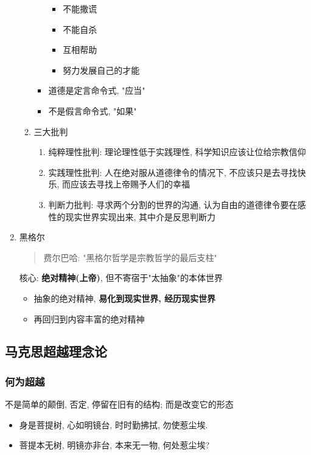 \documentclass[11pt]{article}
\begin{document}
\begin{enumerate}
\begin{enumerate}
\begin{itemize}
\begin{itemize}
\item 不能撒谎
\item 不能自杀
\item 互相帮助
\item 努力发展自己的才能
\end{itemize}
\item 道德是定言命令式, "应当"
\item 不是假言命令式, "如果"
\end{itemize}
\item 三大批判
\label{sec:org4855145}
\begin{enumerate}
\item 纯粹理性批判: 理论理性低于实践理性, 科学知识应该让位给宗教信仰
\item 实践理性批判: 人在绝对服从道德律令的情况下, 不应该只是去寻找快乐, 而应该去寻找上帝赐予人们的幸福
\item 判断力批判: 寻求两个分割的世界的沟通, 认为自由的道德律令要在感性的现实世界实现出来, 其中介是反思判断力
\end{enumerate}
\end{enumerate}
\item 黑格尔
\label{sec:org552c4ad}

\begin{quote}
费尔巴哈: "黑格尔哲学是宗教哲学的最后支柱"
\end{quote}

核心: \textbf{绝对精神(上帝)}, 但不寄宿于"太抽象"的本体世界
\begin{itemize}
\item 抽象的绝对精神, \textbf{易化到现实世界, 经历现实世界}
\item 再回归到内容丰富的绝对精神
\end{itemize}
\end{enumerate}

\subsection{马克思超越理念论}
\label{sec:org6fdc433}
\subsubsection{何为超越}
\label{sec:org4b9359b}
不是简单的颠倒, 否定, 停留在旧有的结构; 而是改变它的形态
\begin{itemize}
\item 身是菩提树, 心如明镜台, 时时勤拂拭, 勿使惹尘埃.
\item 菩提本无树, 明镜亦非台, 本来无一物, 何处惹尘埃?
\end{itemize}
\end{document}
